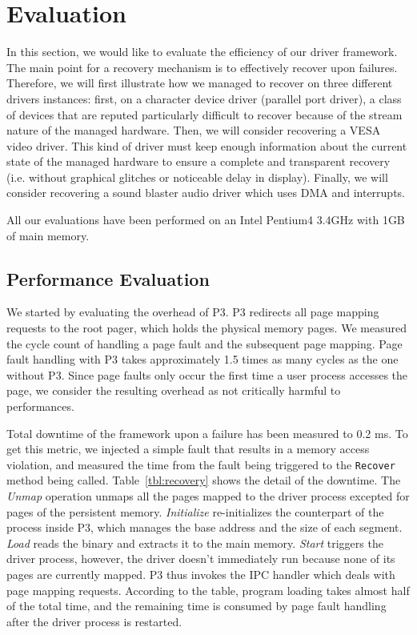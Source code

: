 \documentclass{report}
\begin{document}
\section{Evaluation}
\label{s:eval}

In this section, we would like to evaluate the efficiency of our driver framework. The main point for a recovery mechanism is to effectively recover upon failures. Therefore, we will first illustrate how we managed to recover on three different drivers instances: first, on a character device driver (parallel port driver), a class of devices that are reputed particularly difficult to recover because of the stream nature of the managed hardware. Then, we will consider recovering a VESA video driver. This kind of driver must keep enough information about the current state of the managed hardware to ensure a complete and transparent recovery (i.e. without graphical glitches or noticeable delay in display).  Finally, we will consider recovering a sound blaster audio driver which uses DMA and interrupts.

All our evaluations have been performed on an Intel Pentium4 3.4GHz with 1GB of main memory.

\subsection{Performance Evaluation}
\label{sec:performance}
We started by evaluating the overhead of P3.  P3 redirects all page mapping requests to the root pager, which holds the physical memory pages.  We measured the cycle count of handling a page fault and the subsequent page mapping.  Page fault handling with P3 takes approximately 1.5 times as many cycles as the one without P3.  Since page faults only occur the first time a user process accesses the page, we consider the resulting overhead as not critically harmful to performances.

Total downtime of the framework upon a failure has been measured to 0.2 ms.  To get this metric, we injected a simple fault that results in a memory access violation, and measured the time from the fault being triggered to the {\tt Recover} method being called.  Table~\ref{tbl:recovery} shows the detail of the downtime.  The {\it Unmap} operation unmaps all the pages mapped to the driver process excepted for pages of the persistent memory.  {\it Initialize} re-initializes the counterpart of the process inside P3, which manages the base address and the size of each segment.  {\it Load} reads the binary and extracts it to the main memory. {\it Start} triggers the driver process, however, the driver doesn't immediately run because none of its pages are currently mapped.  P3 thus invokes the IPC handler which deals with page mapping requests.  According to the table, program loading takes almost half of the total time, and the remaining time is consumed by page fault handling after the driver process is restarted.
\end{document}
